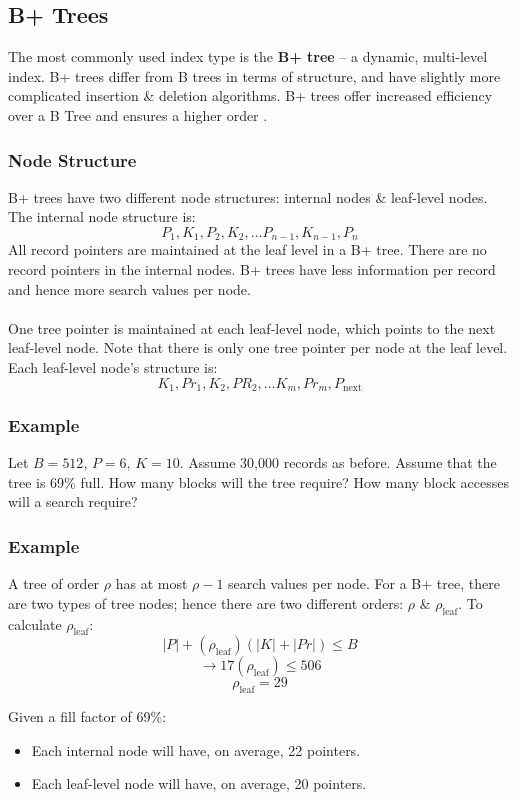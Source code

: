 \documentclass[a4paper,11pt]{article}
\begin{document}
\subsection{B+ Trees}
The most commonly used index type is the \textbf{B+ tree} -- a dynamic, multi-level index. 
B+ trees differ from B trees in terms of structure, and have slightly more complicated insertion \& deletion algorithms.
B+ trees offer increased efficiency over a B Tree and ensures a higher order \rho.

\subsubsection{Node Structure}
B+ trees have two different node structures: internal nodes \& leaf-level nodes.
The internal node structure is:
$$P_1, K_1, P_2, K_2, \dots P_{n-1}, K_{n-1}, P_n$$
All record pointers are maintained at the leaf level in a B+ tree.
There are no record pointers in the internal nodes.
B+ trees have less information per record and hence more search values per node.
\\\\
One tree pointer is maintained at each leaf-level node, which points to the next leaf-level node.
Note that there is only one tree pointer per node at the leaf level.
Each leaf-level node's structure is:
$$K_1, Pr_1, K_2, PR_2, \dots K_m, Pr_m, P_{\text{next}}$$

\subsubsection{Example}
Let $B = 512$, $P = 6$, $K = 10$. 
Assume 30,000 records as before. 
Assume that the tree is 69\% full. 
How many blocks will the tree require? 
How many block accesses will a search require?

\subsubsection{Example}
A tree of order $\rho$ has at most $\rho - 1$ search values per node. 
For a B+ tree, there are two types of tree nodes; hence there are two different orders: $\rho$ \& $\rho_{\text{leaf}}$.
To calculate $\rho_{\text{leaf}}$: 
$$ |P| + (\rho_{\text{leaf}})(|K| + |Pr|) \leq B $$
$$ \rightarrow 17(\rho_{\text{leaf}}) \leq 506 $$
$$ \rho_{\text{leaf}} = 29 $$

Given a fill factor of 69\%:
\begin{itemize}
    \item   Each internal node will have, on average, 22 pointers.
    \item   Each leaf-level node will have, on average, 20 pointers.
\end{itemize}
\end{document}
